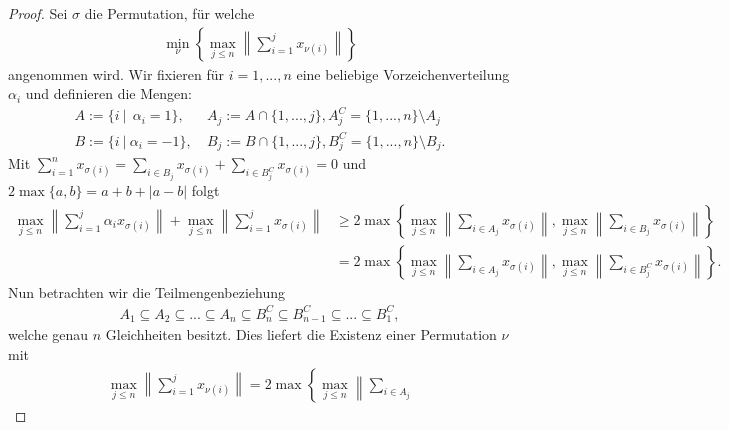 \begin{proof}
	Sei $ \sigma $ die Permutation, für welche
	\begin{align*}
		\min \limits_{\nu }
		\left\{
		\max_{j \leq  n}
		\left\|
		\sum \limits_{i = 1}^j
		x_{\nu(i)}
		\right\|
		\right\}
	\end{align*}
	angenommen wird. Wir fixieren für $ i = 1,...,n $  eine beliebige Vorzeichenverteilung $ \alpha_i  $ und definieren die Mengen:
	\begin{align*}
		A 
		:=
		\{
		i \ | \ \ \alpha_i = 1
		\}
		, \ &A_j := A \cap \{1,...,j\} , A_j^C = \{1,...,n\} \setminus A_j\\
		B 
		:=
		\{
		i \ | \ \alpha_i = -1
		\}
		, \ &B_j := B \cap \{1,...,j\} , B_j^C = \{1,...,n\} \setminus B_j.
	\end{align*}
	Mit $ \sum_{i  = 1 }^n  x_{\sigma(i)}  = \sum_{i \in B_j} x_{\sigma(i)} +  \sum_{i \in B_j^C} x_{\sigma(i)} = 0$ und $ 2 \max\{a,b\} = a + b + | a -b| $ folgt
	\begin{equation}\label{eq:proof_lem_choban_1}
		\begin{split}
			\max \limits_{j \leq n }
			\left\|
			\sum \limits_{i = 1}^j
			\alpha_i x_{\sigma(i)}
			\right\|
			+\max \limits_{j \leq n }
			\left\|
			\sum \limits_{i = 1}^j
			x_{\sigma(i)}
			\right\|
			&\geq
			2 
			\max 
			\left\{
			\max \limits_{j \leq n }
			\left\|
			\sum \limits_{i \in A_j}
			x_{\sigma(i)}
			\right\|,
			\max \limits_{j \leq n }
			\left\|
			\sum \limits_{i \in B_j}
			x_{\sigma(i)}
			\right\|
			\right\}\\
			&=
			2 
			\max 
			\left\{
			\max \limits_{j \leq n }
			\left\|
			\sum \limits_{i \in A_j}
			x_{\sigma(i)}
			\right\|,
			\max \limits_{j \leq n }
			\left\|
			\sum \limits_{i \in B_j^C}
			x_{\sigma(i)}
			\right\|
			\right\}.
		\end{split}
	\end{equation}
	Nun betrachten wir die Teilmengenbeziehung
	\begin{align*}
		A_1 \subseteq A_2 \subseteq ... \subseteq A_n \subseteq B_n^C 
		\subseteq B_{n-1}^C \subseteq ... \subseteq B_1^C,
	\end{align*}
	welche genau $ n $ Gleichheiten besitzt. Dies liefert die Existenz einer Permutation $ \nu $ mit
	\begin{align}\label{eq:proof_lem_choban_2}
		\max_{j \leq  n}
		\left\|
		\sum \limits_{i = 1}^j
		x_{\nu(i)}
		\right\|
		=
		2 
		\max 
		\left\{
		\max \limits_{j \leq n }
		\left\|
		\sum \limits_{i \in A_j}

\end{align}
\end{proof}
